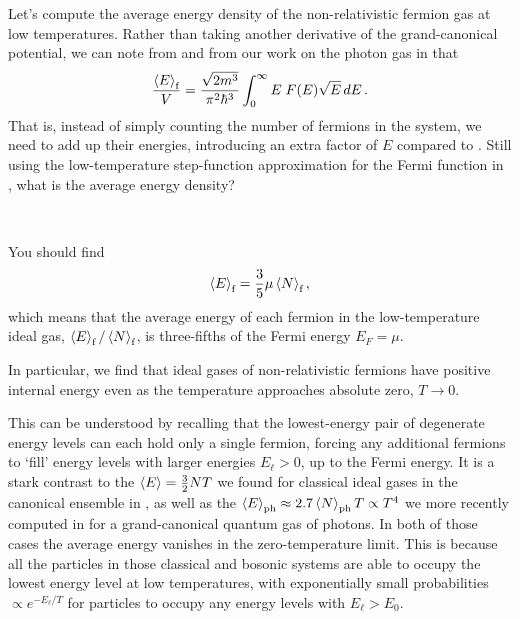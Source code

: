 Let's compute the average energy density of the non-relativistic fermion gas at low temperatures.
Rather than taking another derivative of the grand-canonical potential, we can note from  and from our work on the photon gas in  that
\begin{equation}
  \frac{\left\langle E \right\rangle_{\text{f}}}{V} = \frac{\sqrt{2m^3}}{\pi^2 \hbar^3} \int_0^{\infty} E \; F(E) \sqrt{E} \mathop{dE}.
\end{equation}
That is, instead of simply counting the number of fermions in the system, we need to add up their energies, introducing an extra factor of $E$ compared to .
Still using the low-temperature step-function approximation for the Fermi function in , what is the average energy density?
\begin{mdframed}
  \ \\[100 pt]
\end{mdframed}
You should find
\begin{equation}
  \label{eq:fermi_E_N}
  \left\langle E \right\rangle_{\text{f}} = \frac{3}{5} \mu \left\langle N \right\rangle_{\text{f}},
\end{equation}
which means that the average energy of each fermion in the low-temperature ideal gas, $\left\langle E \right\rangle_{\text{f}} / \left\langle N \right\rangle_{\text{f}}$, is three-fifths of the Fermi energy $E_F = \mu$.

\begin{shaded}
  In particular, we find that ideal gases of non-relativistic fermions have positive internal energy even as the temperature approaches absolute zero, $T \to 0$.
\end{shaded}

This can be understood by recalling that the lowest-energy pair of degenerate energy levels can each hold only a single fermion, forcing any additional fermions to `fill' energy levels with larger energies $E_{\ell} > 0$, up to the Fermi energy.
It is a stark contrast to the $\left\langle E \right\rangle = \frac{3}{2} N T$ we found for classical ideal gases in the canonical ensemble in , as well as the $\left\langle E \right\rangle_{\text{ph}} \approx 2.7 \left\langle N \right\rangle_{\text{ph}} T \propto T^4$ we more recently computed in  for a grand-canonical quantum gas of photons.
In both of those cases the average energy vanishes in the zero-temperature limit.
This is because all the particles in those classical and bosonic systems are able to occupy the lowest energy level at low temperatures, with exponentially small probabilities $\propto e^{-E_{\ell}/ T}$ for particles to occupy any energy levels with $E_{\ell} > E_0$.

